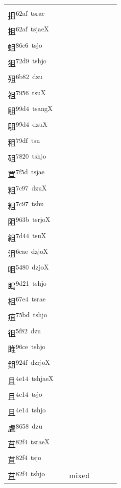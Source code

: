 \documentclass[14pt,a4paper]{scrartcl}
\begin{document}
\begin{longtable}[c]{@{}llllll@{}}
\begin{minipage}[t]{0.14\columnwidth}
抯\textsuperscript{62af~dzjaeX}\\
抯\textsuperscript{62af~tsrae}\\
抯\textsuperscript{62af~tsjaeX}\\
蛆\textsuperscript{86c6~tsjo}\\
狙\textsuperscript{72d9~tshjo}\\
殂\textsuperscript{6b82~dzu}\\
祖\textsuperscript{7956~tsuX}\\
駔\textsuperscript{99d4~tsangX}\\
駔\textsuperscript{99d4~dzuX}\\
租\textsuperscript{79df~tsu}\\
砠\textsuperscript{7820~tshjo}\\
罝\textsuperscript{7f5d~tsjae}\\
粗\textsuperscript{7c97~dzuX}\\
粗\textsuperscript{7c97~tshu}\\
阻\textsuperscript{963b~tsrjoX}\\
組\textsuperscript{7d44~tsuX}\\
沮\textsuperscript{6cae~dzjoX}\\
咀\textsuperscript{5480~dzjoX}\\
鴡\textsuperscript{9d21~tshjo}\\
柤\textsuperscript{67e4~tsrae}\\
疽\textsuperscript{75bd~tshjo}\\
徂\textsuperscript{5f82~dzu}\\
雎\textsuperscript{96ce~tshjo}\\
鉏\textsuperscript{924f~dzrjoX}\\
且\textsuperscript{4e14~tshjaeX}\\
且\textsuperscript{4e14~tsjo}\\
且\textsuperscript{4e14~tshjo}\\
虘\textsuperscript{8658~dzu}\\
苴\textsuperscript{82f4~tsraeX}\\
苴\textsuperscript{82f4~tsjo}\\
苴\textsuperscript{82f4~tshjo}
\strut\end{minipage} &
\begin{minipage}[t]{0.14\columnwidth}\raggedright\strut
\strut\end{minipage} &
\begin{minipage}[t]{0.14\columnwidth}\raggedright\strut
mixed
\strut\end{minipage}\tabularnewline

\end{longtable}
\end{document}
